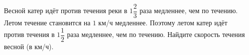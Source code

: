 \begin{ex}
	\begin{condition}
		Весной катер идёт против течения реки в \( 1\dfrac{2}{3} \) раза медленнее, чем по течению. Летом течение становится на \( 1  \) км/ч медленнее. Поэтому летом катер идёт против течения в \( 1\dfrac{1}{2} \) раза медленнее, чем по течению. Найдите скорость течения весной (в км/ч).
	\end{condition}
\end{ex}